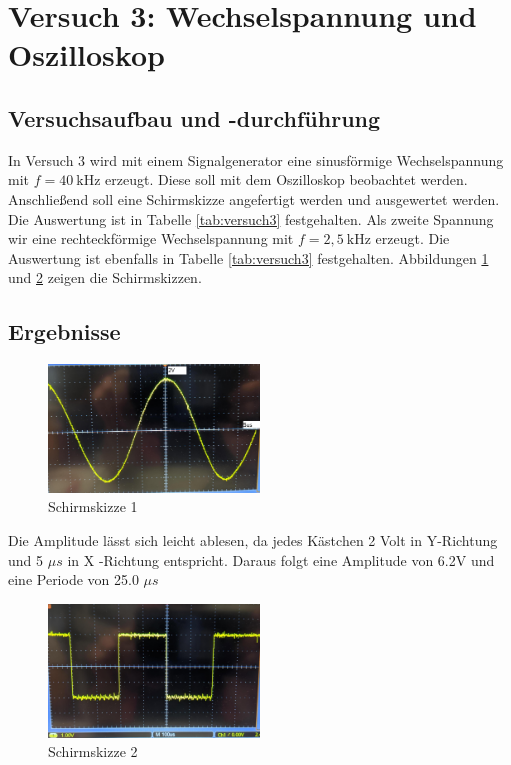 \section{Versuch 3: Wechselspannung und Oszilloskop}

    \subsection{Versuchsaufbau und -durchführung}
        
        In Versuch 3 wird mit einem Signalgenerator eine sinusförmige Wechselspannung mit $f = 40\ \mathrm{kHz}$ erzeugt. Diese soll mit dem Oszilloskop beobachtet werden. Anschließend soll eine Schirmskizze angefertigt werden und ausgewertet werden. Die Auswertung ist in Tabelle \ref{tab:versuch3} festgehalten. Als zweite Spannung wir eine rechteckförmige Wechselspannung mit $f = 2,5\ \mathrm{kHz}$ erzeugt. Die Auswertung ist ebenfalls in Tabelle \ref{tab:versuch3} festgehalten.
        Abbildungen \ref{fig:versuch3sinus} und \ref{fig:versuch3eckig} zeigen die Schirmskizzen.

    \subsection{Ergebnisse}

        \begin{figure}[H]
            \centering
            \includegraphics[width=0.5\textwidth]{bilder/Sinus.png}
            \caption{Schirmskizze 1}
       	    \label{fig:versuch3sinus}
        \end{figure}
    
		Die Amplitude lässt sich leicht ablesen, da jedes Kästchen 2 Volt in Y-Richtung und 5 $\mu s$ in X -Richtung entspricht. Daraus folgt eine Amplitude von 6.2V und eine Periode von 25.0 $\mu s$

        \begin{figure}[H]
            \centering
            \includegraphics[width=0.5\textwidth]{bilder/Eckig.png}
	        \caption{Schirmskizze 2}
	        \label{fig:versuch3eckig}            
        \end{figure}


